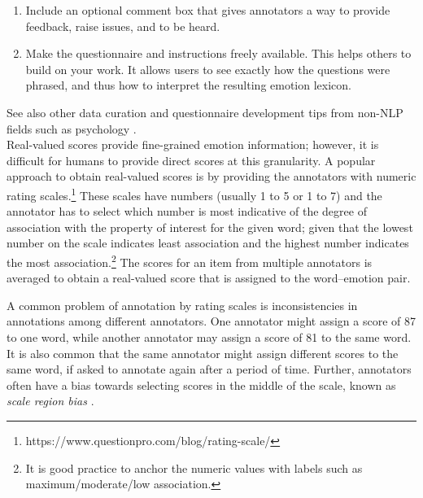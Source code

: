 \documentclass[11pt]{article}
\begin{document}
\begin{enumerate}[label=\alph*.]
\item Include an optional comment box that gives annotators a way to provide feedback, raise issues, and to be heard.\\[-18pt]
\item Make the questionnaire and instructions freely available. %
This helps others %
to build on your work. It allows users to see exactly how the questions were phrased, and thus how to interpret the resulting emotion lexicon.\\[-18pt]
\end{enumerate}
\noindent See also other data curation and questionnaire development tips from non-NLP fields such as psychology \cite{doi:10.1177/1094428119836485}. \\[-4pt]


 Real-valued scores provide fine-grained emotion information; 
however, it is difficult for humans to provide direct scores at this granularity. 
A popular approach to obtain real-valued scores is by providing the annotators with numeric rating scales.\footnote{https://www.questionpro.com/blog/rating-scale/}
These scales have numbers (usually 1 to 5 or 1 to 7) and the annotator has to select which number is most indicative of the degree of association with the property of interest for the given word; given that the lowest number on the scale indicates least association and the highest number indicates the most association.\footnote{It is good practice to anchor the numeric values with 
labels such as maximum/moderate/low association.}
The scores for an item from multiple annotators is averaged to obtain a real-valued score that is assigned to the word--emotion pair. 

A common problem of annotation by rating scales is inconsistencies in annotations among different annotators. One annotator might assign a score of 87 to one word, while another annotator may assign a score of 81 to the same word. It is also common that the same annotator might assign different scores to the same word, %
if asked to annotate again after a period of time.
Further, annotators often have a bias towards selecting scores in the middle of the scale, known as {\it scale region bias} \cite{presser2004questions,baumgartner2001response}.\\[-10pt]
\end{document}
